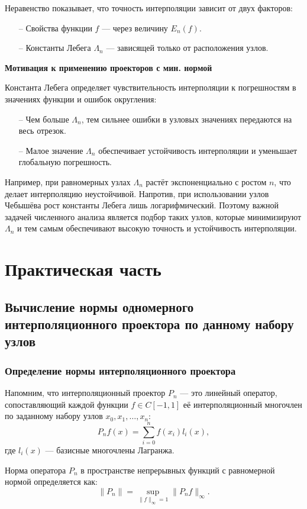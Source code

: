\documentclass[14pt,openany,a4paper,oneside]{extarticle}
\begin{document}
	Неравенство показывает, что точность интерполяции зависит от двух факторов:
	\begin{enumerate}
		\item[--] Свойства функции $f$ — через величину $E_n(f)$.
		\item[--] Константы Лебега $\Lambda_n$ — зависящей только от расположения узлов. 
	\end{enumerate}
	
	\textbf{Мотивация к применению проекторов с мин. нормой}
	
	Константа Лебега определяет чувствительность интерполяции к погрешностям в значениях функции и ошибок округления:
	\begin{enumerate}
		\item[--] Чем больше $\Lambda_n$, тем сильнее ошибки в узловых значениях передаются на весь отрезок.
		\item[--] Малое значение $\Lambda_n$ обеспечивает устойчивость интерполяции и уменьшает глобальную погрешность.
	\end{enumerate}
	
	Например, при равномерных узлах $\Lambda_n$ растёт экспоненциально с ростом $n$, что делает интерполяцию неустойчивой. Напротив, при использовании узлов Чебышёва рост константы Лебега лишь логарифмический. Поэтому важной задачей численного анализа является подбор таких узлов, которые минимизируют $\Lambda_n$ и тем самым обеспечивают высокую точность и устойчивость интерполяции.
	
	\newpage
	\section{Практическая часть}
	\subsection{Вычисление нормы одномерного интерполяционного проектора по данному набору узлов}
	\subsubsection{Определение нормы интерполяционного проектора}
	
	Напомним, что интерполяционный проектор $P_n$ — это линейный оператор, сопоставляющий каждой функции $f\in C[-1,1]$ её интерполяционный многочлен по заданному набору узлов $x_0,x_1,\dots,x_n:$
	$$P_nf(x)=\sum^n_{i=0}f(x_i)l_i(x),$$
	где $l_i(x)$ — базисные многочлены Лагранжа.
	
	Норма оператора $P_n$ в пространстве непрерывных функций с равномерной нормой определяется как: $$\|P_n\|=\sup_{\|f\|_\infty=1}\|P_nf\|_\infty.$$
	
\end{document}
